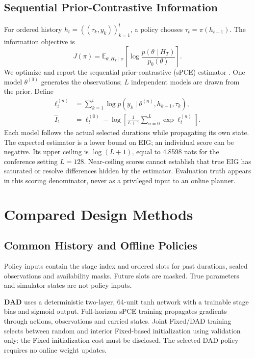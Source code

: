 \documentclass[conference]{IEEEtran}
\newcommand{\E}{\mathbb E}
\begin{document}
\subsection{Sequential Prior-Contrastive Information}
For ordered history $h_t=((\tau_k,y_k))_{k=1}^t$, a policy chooses
$\tau_t=\pi(h_{t-1})$. The information objective is
\begin{equation}
J(\pi)=\E_{\theta,H_T\mid\pi}
\left[\log\frac{p(\theta\mid H_T)}{p_0(\theta)}\right].
\end{equation}
We optimize and report the sequential prior-contrastive (sPCE) estimator
\cite{foster2021dad}. One model $\theta^{(0)}$ generates the observations;
$L$ independent models are drawn from the prior. Define
\begin{align}
\ell_t^{(n)}&=\sum_{k=1}^t\log p(y_k\mid\theta^{(n)},h_{k-1},\tau_k),\\
\widehat I_t&=\ell_t^{(0)}-
\log\left[\frac{1}{L+1}\sum_{n=0}^L\exp\ell_t^{(n)}\right].
\label{eq:spce}
\end{align}
Each model follows the actual selected durations while propagating its own
state. The expected estimator is a lower bound on EIG; an individual score
can be negative. Its upper ceiling is $\log(L+1)$, equal to 4.8598 nats for
the conference setting $L=128$. Near-ceiling scores cannot establish that
true EIG has saturated or resolve differences hidden by the estimator.
Evaluation truth appears in this scoring denominator, never as a privileged
input to an online planner.

\section{Compared Design Methods}
\subsection{Common History and Offline Policies}
Policy inputs contain the stage index and ordered slots for past durations,
scaled observations and availability masks. Future slots are masked.
True parameters and simulator states are not policy inputs.

\textbf{DAD} uses a deterministic two-layer, 64-unit tanh network with a
trainable stage bias and sigmoid output. Full-horizon sPCE training propagates
gradients through actions, observations and carried states. Joint Fixed/DAD
training selects between random and interior Fixed-based initialization
using validation only; the Fixed initialization cost must be disclosed.
The selected DAD policy requires no online weight updates.
\end{document}
